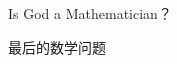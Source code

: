 \documentclass[main.tex]{subfiles}
\begin{document}
Is God a Mathematician？\cite{LivioM}

最后的数学问题 \cite{LivioM2}

\newpage
\end{document}
